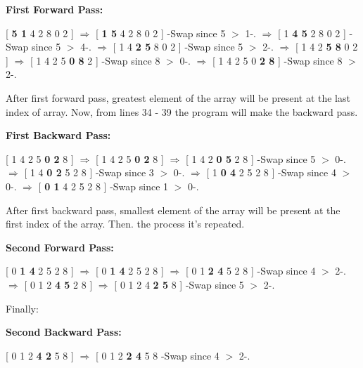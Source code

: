 \begin{flushleft}
{\bfseries First Forward Pass:} \hfill \break

[ {\bfseries 5 1} 4 2 8 0 2 ] $\Rightarrow$ [ {\bfseries 1 5} 4 2 8 0 2 ] -Swap since 5 $>$ 1-. \hfill \break
[ 1 {\bfseries 5 4} 2 8 0 2 ] $\Rightarrow$ [ 1 {\bfseries 4 5} 2 8 0 2 ] -Swap since 5 $>$ 4-. \hfill \break
[ 1 4 {\bfseries 5 2} 8 0 2 ] $\Rightarrow$ [ 1 4 {\bfseries 2 5} 8 0 2 ] -Swap since 5 $>$ 2-. \hfill \break
[ 1 4 2 {\bfseries 5 8} 0 2 ] $\Rightarrow$ [ 1 4 2 {\bfseries 5 8} 0 2 ] \hfill \break
[ 1 4 2 5 {\bfseries 8 0} 2 ] $\Rightarrow$ [ 1 4 2 5 {\bfseries 0 8} 2 ] -Swap since 8 $>$ 0-. \hfill \break
[ 1 4 2 5 0 {\bfseries 8 2} ] $\Rightarrow$ [ 1 4 2 5 0 {\bfseries 2 8} ] -Swap since 8 $>$ 2-. \hfill \break

After first forward pass, greatest element of the array will be present at the last index of array. Now, from lines 34 - 39 the program will make the backward pass. \pagebreak

{\bfseries First Backward Pass:} \hfill \break

[ 1 4 2 5 {\bfseries 0 2} 8 ] $\Rightarrow$ [ 1 4 2 5 {\bfseries 0 2} 8 ] \hfill \break
[ 1 4 2 {\bfseries 5 0} 2 8 ] $\Rightarrow$ [ 1 4 2 {\bfseries 0 5} 2 8 ] -Swap since 5 $>$ 0-. \hfill \break
[ 1 4 {\bfseries 2 0} 5 2 8 ] $\Rightarrow$ [ 1 4 {\bfseries 0 2} 5 2 8 ] -Swap since 3 $>$ 0-. \hfill \break
[ 1 {\bfseries 4 0} 2 5 2 8 ] $\Rightarrow$ [ 1 {\bfseries 0 4} 2 5 2 8 ] -Swap since 4 $>$ 0-. \hfill \break
[ {\bfseries 1 0} 4 2 5 2 8 ] $\Rightarrow$ [ {\bfseries 0 1} 4 2 5 2 8 ] -Swap since 1 $>$ 0-. \hfill \break

After first backward pass, smallest element of the array will be present at the first index of the array. Then. the process it's repeated. \hfill \break

{\bfseries Second Forward Pass:} \hfill \break

[ 0 {\bfseries 1 4} 2 5 2 8 ] $\Rightarrow$ [ 0 {\bfseries 1 4} 2 5 2 8 ] \hfill \break
[ 0 1 {\bfseries 4 2} 5 2 8 ] $\Rightarrow$ [ 0 1 {\bfseries 2 4} 5 2 8 ] -Swap since 4 $>$ 2-. \hfill \break
[ 0 1 2 {\bfseries 4 5} 2 8 ] $\Rightarrow$ [ 0 1 2 {\bfseries 4 5} 2 8 ] \hfill \break
[ 0 1 2 4 {\bfseries 5 2} 8 ] $\Rightarrow$ [ 0 1 2 4 {\bfseries 2 5} 8 ] -Swap since 5 $>$ 2-. \hfill \break

Finally: \hfill \break

{\bfseries Second Backward Pass:} \hfill \break

[ 0 1 2 {\bfseries 4 2} 5 8 ] $\Rightarrow$ [ 0 1 2 {\bfseries 2 4} 5 8  -Swap since 4 $>$ 2-.
\end{flushleft}